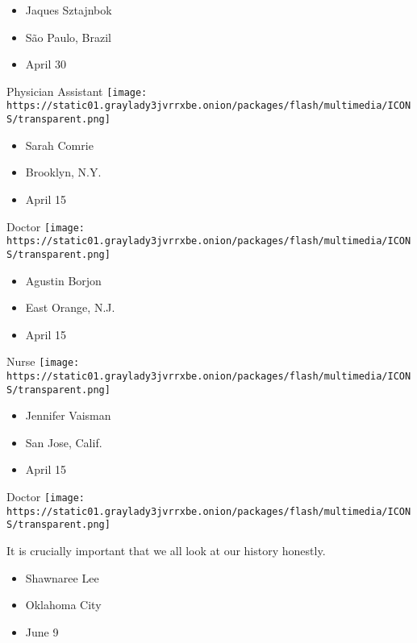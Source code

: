 \begin{itemize}
\tightlist
\item
  Jaques Sztajnbok
\item
  São Paulo, Brazil
\item
  April 30
\end{itemize}

\protect\hyperlink{item-sarah-comrie}{}

Physician Assistant
\texttt{[image: https://static01.graylady3jvrrxbe.onion/packages/flash/multimedia/ICONS/transparent.png]}

\begin{itemize}
\tightlist
\item
  Sarah Comrie
\item
  Brooklyn, N.Y.
\item
  April 15
\end{itemize}

\protect\hyperlink{item-agustin-borjon}{}

Doctor
\texttt{[image: https://static01.graylady3jvrrxbe.onion/packages/flash/multimedia/ICONS/transparent.png]}

\begin{itemize}
\tightlist
\item
  Agustin Borjon
\item
  East Orange, N.J.
\item
  April 15
\end{itemize}

\protect\hyperlink{item-jennifer-vaisman}{}

Nurse
\texttt{[image: https://static01.graylady3jvrrxbe.onion/packages/flash/multimedia/ICONS/transparent.png]}

\begin{itemize}
\tightlist
\item
  Jennifer Vaisman
\item
  San Jose, Calif.
\item
  April 15
\end{itemize}

\protect\hyperlink{item-shawnaree-lee}{}

Doctor
\texttt{[image: https://static01.graylady3jvrrxbe.onion/packages/flash/multimedia/ICONS/transparent.png]}

It is crucially important that we all look at our history honestly.

\begin{itemize}
\tightlist
\item
  Shawnaree Lee
\item
  Oklahoma City
\item
  June 9
\end{itemize}

